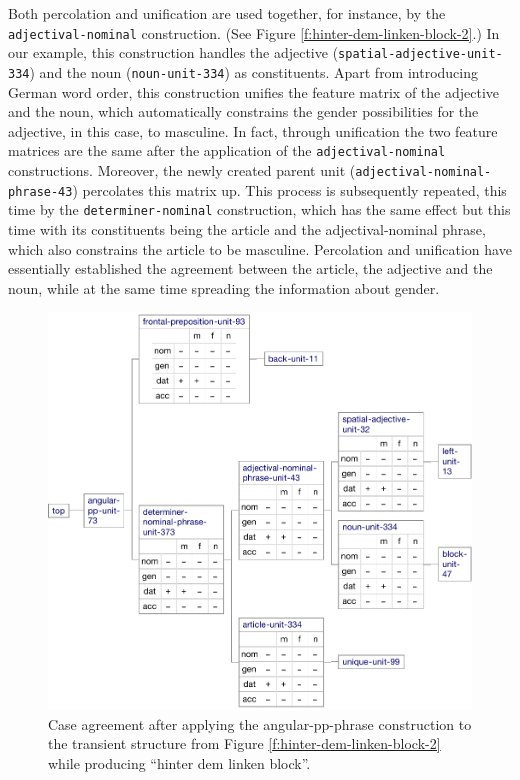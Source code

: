 Both percolation and unification are used together, for instance, by
the {\footnotesize\tt adjectival-nominal} construction. (See Figure
\ref{f:hinter-dem-linken-block-2}.) In our example, this construction
handles the adjective ({\footnotesize\texttt{spatial-adjective-unit-334}}) and
the noun ({\footnotesize\texttt{noun-unit-334}}) as constituents. Apart from introducing
German word order, this construction unifies the feature matrix of the
adjective and the noun, which automatically constrains the gender
possibilities for the adjective, in this case, to masculine. In fact,
through unification the two feature matrices are the same after the
application of the {\footnotesize\tt adjectival-nominal}
constructions. Moreover, the newly created parent unit
({\footnotesize\texttt{adjectival-nominal-phrase-43}}) percolates this matrix
up. This process is subsequently repeated, this time by the
{\footnotesize\tt determiner-nominal} construction, which has the same effect
but this time with its constituents being the article and the
adjectival-nominal phrase, which also constrains the article to be
masculine. Percolation and unification have essentially
established the agreement between the article, the adjective and the
noun, while at the same time spreading the information about gender.


\begin{figure}[t]
  \centerline{\includegraphics[scale=0.61]{figs/hinter-dem-linken-block-3}}
  \caption[Case agreement represented in the transient structure]{
  Case agreement after applying the angular-pp-phrase
    construction to the transient structure from Figure
    \ref{f:hinter-dem-linken-block-2} while producing ``hinter dem
    linken block''.}
  \label{f:hinter-dem-linken-block-3}
\end{figure}


